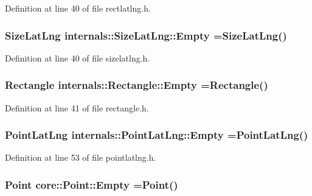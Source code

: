 Definition at line 40 of file rectlatlng.\-h.

\hypertarget{group___o_p_map_widget_gad305f7cf650e7a5490bb77ccc65bbe08}{
\subsubsection[{Empty}]{\setlength{\rightskip}{0pt plus 5cm}Size\-Lat\-Lng internals\-::\-Size\-Lat\-Lng\-::\-Empty =Size\-Lat\-Lng()\hspace{0.3cm}{\ttfamily [static]}}}\label{group___o_p_map_widget_gad305f7cf650e7a5490bb77ccc65bbe08}


Definition at line 40 of file sizelatlng.\-h.

\hypertarget{group___o_p_map_widget_ga747b738c524d1f0bb7b4a00e9de42da4}{
\subsubsection[{Empty}]{\setlength{\rightskip}{0pt plus 5cm}Rectangle internals\-::\-Rectangle\-::\-Empty =Rectangle()\hspace{0.3cm}{\ttfamily [static]}}}\label{group___o_p_map_widget_ga747b738c524d1f0bb7b4a00e9de42da4}


Definition at line 41 of file rectangle.\-h.

\hypertarget{group___o_p_map_widget_gac62d167bf1e7f0374f7e536e64320c13}{
\subsubsection[{Empty}]{\setlength{\rightskip}{0pt plus 5cm}Point\-Lat\-Lng internals\-::\-Point\-Lat\-Lng\-::\-Empty =Point\-Lat\-Lng()\hspace{0.3cm}{\ttfamily [static]}}}\label{group___o_p_map_widget_gac62d167bf1e7f0374f7e536e64320c13}


Definition at line 53 of file pointlatlng.\-h.

\hypertarget{group___o_p_map_widget_ga8f0f8df337a57e048e21c0410bd1a7e3}{
\subsubsection[{Empty}]{\setlength{\rightskip}{0pt plus 5cm}Point core\-::\-Point\-::\-Empty =Point()\hspace{0.3cm}{\ttfamily [static]}}}\label{group___o_p_map_widget_ga8f0f8df337a57e048e21c0410bd1a7e3}


